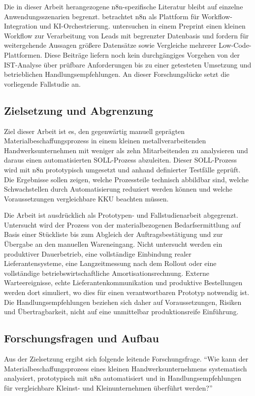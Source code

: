 \documentclass[a4paper,12pt]{article}
\begin{document}
Die in dieser Arbeit herangezogene n8n-spezifische Literatur bleibt auf einzelne Anwendungsszenarien begrenzt. \Textcite{venkiteela_n8n_2025} betrachtet n8n als Plattform für Workflow-Integration und KI-Orchestrierung. \Textcite{amir_evaluating_2026} untersuchen in einem Preprint einen kleinen Workflow zur Verarbeitung von Leads mit begrenzter Datenbasis und fordern für weitergehende Aussagen größere Datensätze sowie Vergleiche mehrerer Low-Code-Plattformen. Diese Beiträge liefern noch kein durchgängiges Vorgehen von der IST-Analyse über prüfbare Anforderungen bis zu einer getesteten Umsetzung und betrieblichen Handlungsempfehlungen. An dieser Forschungslücke setzt die vorliegende Fallstudie an.

\subsection{Zielsetzung und Abgrenzung}
\label{sec:zielsetzung-abgrenzung}
Ziel dieser Arbeit ist es, den gegenwärtig manuell geprägten Materialbeschaffungsprozess in einem kleinen metallverarbeitenden Handwerksunternehmen mit weniger als zehn Mitarbeitenden zu analysieren und daraus einen automatisierten SOLL-Prozess abzuleiten. Dieser SOLL-Prozess wird mit n8n prototypisch umgesetzt und anhand definierter Testfälle geprüft. Die Ergebnisse sollen zeigen, welche Prozessteile technisch abbildbar sind, welche Schwachstellen durch Automatisierung reduziert werden können und welche Voraussetzungen vergleichbare KKU beachten müssen.

Die Arbeit ist ausdrücklich als Prototypen- und Fallstudienarbeit abgegrenzt. Untersucht wird der Prozess von der materialbezogenen Bedarfsermittlung auf Basis einer Stückliste bis zum Abgleich der Auftragsbestätigung und zur Übergabe an den manuellen Wareneingang. Nicht untersucht werden ein produktiver Dauerbetrieb, eine vollständige Einbindung realer Lieferantensysteme, eine Langzeitmessung nach dem Rollout oder eine vollständige betriebswirtschaftliche Amortisationsrechnung. Externe Warteereignisse, echte Lieferantenkommunikation und produktive Bestellungen werden dort simuliert, wo dies für einen verantwortbaren Prototyp notwendig ist. Die Handlungsempfehlungen beziehen sich daher auf Voraussetzungen, Risiken und Übertragbarkeit, nicht auf eine unmittelbar produktionsreife Einführung.

\subsection{Forschungsfragen und Aufbau}
Aus der Zielsetzung ergibt sich folgende leitende Forschungsfrage. \enquote{Wie kann der Materialbeschaffungsprozess eines kleinen Handwerksunternehmens systematisch analysiert, prototypisch mit n8n automatisiert und in Handlungsempfehlungen für vergleichbare Kleinst- und Kleinunternehmen überführt werden?}
\end{document}

